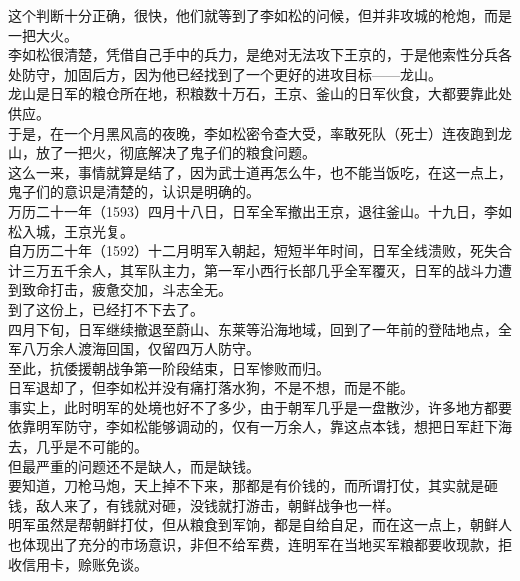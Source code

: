 \begin{multicols}{\theparacolNo}
这个判断十分正确，很快，他们就等到了李如松的问候，但并非攻城的枪炮，而是一把大火。\\

李如松很清楚，凭借自己手中的兵力，是绝对无法攻下王京的，于是他索性分兵各处防守，加固后方，因为他已经找到了一个更好的进攻目标——龙山。\\

龙山是日军的粮仓所在地，积粮数十万石，王京、釜山的日军伙食，大都要靠此处供应。\\

于是，在一个月黑风高的夜晚，李如松密令查大受，率敢死队（死士）连夜跑到龙山，放了一把火，彻底解决了鬼子们的粮食问题。\\

这么一来，事情就算是结了，因为武士道再怎么牛，也不能当饭吃，在这一点上，鬼子们的意识是清楚的，认识是明确的。\\

万历二十一年（1593）四月十八日，日军全军撤出王京，退往釜山。十九日，李如松入城，王京光复。\\

自万历二十年（1592）十二月明军入朝起，短短半年时间，日军全线溃败，死失合计三万五千余人，其军队主力，第一军小西行长部几乎全军覆灭，日军的战斗力遭到致命打击，疲惫交加，斗志全无。\\

到了这份上，已经打不下去了。\\

四月下旬，日军继续撤退至蔚山、东莱等沿海地域，回到了一年前的登陆地点，全军八万余人渡海回国，仅留四万人防守。\\

至此，抗倭援朝战争第一阶段结束，日军惨败而归。\\

日军退却了，但李如松并没有痛打落水狗，不是不想，而是不能。\\

事实上，此时明军的处境也好不了多少，由于朝军几乎是一盘散沙，许多地方都要依靠明军防守，李如松能够调动的，仅有一万余人，靠这点本钱，想把日军赶下海去，几乎是不可能的。\\

但最严重的问题还不是缺人，而是缺钱。\\

要知道，刀枪马炮，天上掉不下来，那都是有价钱的，而所谓打仗，其实就是砸钱，敌人来了，有钱就对砸，没钱就打游击，朝鲜战争也一样。\\

明军虽然是帮朝鲜打仗，但从粮食到军饷，都是自给自足，而在这一点上，朝鲜人也体现出了充分的市场意识，非但不给军费，连明军在当地买军粮都要收现款，拒收信用卡，赊账免谈。\\


\end{multicols}
